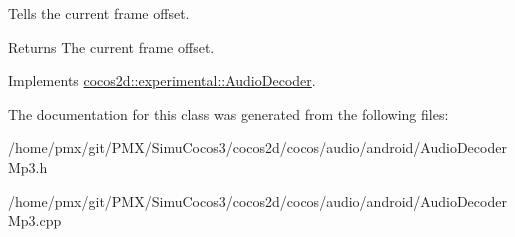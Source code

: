 Tells the current frame offset. 

\begin{DoxyReturn}{Returns}
The current frame offset. 
\end{DoxyReturn}


Implements \hyperlink{classcocos2d_1_1experimental_1_1AudioDecoder_a6c7f6cb06a8eb9e584ff6097a3f37e95}{cocos2d\+::experimental\+::\+Audio\+Decoder}.



The documentation for this class was generated from the following files\+:\begin{DoxyCompactItemize}
\item 
/home/pmx/git/\+P\+M\+X/\+Simu\+Cocos3/cocos2d/cocos/audio/android/Audio\+Decoder\+Mp3.\+h\item 
/home/pmx/git/\+P\+M\+X/\+Simu\+Cocos3/cocos2d/cocos/audio/android/Audio\+Decoder\+Mp3.\+cpp\end{DoxyCompactItemize}
